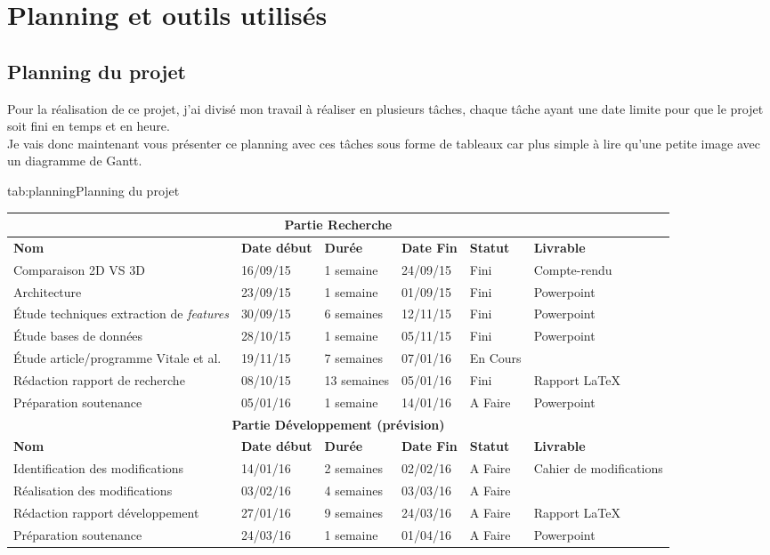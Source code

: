 \documentclass[poster]{polytech/polytech}
\begin{document}
\chapter{Planning et outils utilisés}
\label{chap:chap_planning}

\section{Planning du projet}
Pour la réalisation de ce projet, j'ai divisé mon travail à réaliser en plusieurs tâches, chaque tâche ayant une date limite pour que le projet soit fini en temps et en heure.\\
Je vais donc maintenant vous présenter ce planning avec ces tâches sous forme de tableaux car plus simple à lire qu'une petite image avec un diagramme de Gantt.

\begin{Table}{tab:planning}{Planning du projet}
	\begin{tabular}{|p{4cm}|p{2cm}|p{2cm}|p{2cm}|p{1cm}|p{2cm}|}
		\hline
		\multicolumn{6}{|c|}{\textbf{Partie Recherche}}\\\hline
		\textbf{Nom} &\textbf{Date début} &\textbf{Durée} &\textbf{Date Fin} &\textbf{Statut} &\textbf{Livrable}\\\hline
		Comparaison 2D VS 3D &16/09/15 &1 semaine &24/09/15 &Fini & Compte-rendu\\\hline
		Architecture &23/09/15 &1 semaine &01/09/15 &Fini  & Powerpoint\\\hline
		Étude techniques extraction de \textit{features} &30/09/15 &6 semaines &12/11/15 &Fini & Powerpoint\\\hline
		Étude bases de données &28/10/15 &1 semaine &05/11/15 &Fini & Powerpoint\\\hline
		Étude article/programme Vitale et al. &19/11/15 &7 semaines &07/01/16 &En Cours & \\\hline
		Rédaction rapport de recherche &08/10/15 &13 semaines &05/01/16 &Fini & Rapport \LaTeX\\\hline
		Préparation soutenance &05/01/16 &1 semaine &14/01/16 &A Faire & Powerpoint\\\hline
		\hline
		\multicolumn{6}{|c|}{\textbf{Partie Développement (prévision)}}\\\hline
		\textbf{Nom} &\textbf{Date début} &\textbf{Durée} &\textbf{Date Fin} &\textbf{Statut} &\textbf{Livrable}\\\hline
		Identification des modifications &14/01/16 &2 semaines &02/02/16 &A Faire & Cahier de modifications\\\hline
		Réalisation des modifications &03/02/16 &4 semaines &03/03/16 &A Faire & \\\hline
		Rédaction rapport développement &27/01/16 &9 semaines &24/03/16 &A Faire & Rapport \LaTeX\\\hline
		Préparation soutenance &24/03/16 &1 semaine &01/04/16 &A Faire & Powerpoint\\\hline
	\end{tabular}
\end{Table}
\end{document}
